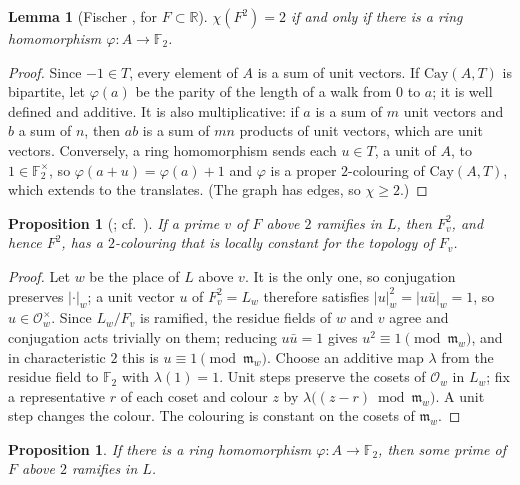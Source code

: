 \documentclass[11pt,a4paper]{amsart}
\newtheorem{proposition}[theorem]{Proposition}
\newtheorem{lemma}[theorem]{Lemma}
\theoremstyle{definition}
\newcommand{\F}{\mathbb{F}}
\newcommand{\R}{\mathbb{R}}
\newcommand{\Oo}{\mathcal{O}}
\newcommand{\m}{\mathfrak{m}}
\begin{document}
\begin{lemma}[Fischer {\cite[Theorem~1(iii)]{Fischer1990}}, for $F\subset\R$]\label{lem:ring}
$\chi(F^2)=2$ if and only if there is a ring homomorphism $\varphi:A\to\F_2$.
\end{lemma}

\begin{proof}
Since $-1\in T$, every element of $A$ is a sum of unit vectors. If $\mathrm{Cay}(A,T)$ is bipartite, let
$\varphi(a)$ be the parity of the length of a walk from $0$ to $a$; it is well defined and additive. It is also
multiplicative: if $a$ is a sum of $m$ unit vectors and $b$ a sum of $n$, then $ab$ is a sum of $mn$ products of
unit vectors, which are unit vectors. Conversely, a ring homomorphism sends each $u\in T$, a unit of $A$, to
$1\in\F_2^\times$, so $\varphi(a+u)=\varphi(a)+1$ and $\varphi$ is a proper $2$-colouring of $\mathrm{Cay}(A,T)$,
which extends to the translates. (The graph has edges, so $\chi\ge2$.)
\end{proof}

\begin{proposition}[{\cite[Theorem~A$'$]{MM}}; cf.\ {\cite[Propositions~3.2, 3.8 and~3.9]{Madore}}]\label{prop:if}
If a prime $v$ of $F$ above $2$ ramifies in $L$, then $F_v^2$, and hence $F^2$, has a $2$-colouring that is
locally constant for the topology of $F_v$.
\end{proposition}

\begin{proof}
Let $w$ be the place of $L$ above $v$. It is the only one, so conjugation preserves $|\cdot|_w$; a unit vector
$u$ of $F_v^2=L_w$ therefore satisfies $|u|_w^2=|u\bar u|_w=1$, so $u\in\Oo_w^\times$. Since $L_w/F_v$ is
ramified, the residue fields of $w$ and $v$ agree and conjugation acts trivially on them; reducing $u\bar u=1$
gives $u^2\equiv1\pmod{\m_w}$, and in characteristic $2$ this is $u\equiv1\pmod{\m_w}$. Choose an additive map
$\lambda$ from the residue field to $\F_2$ with $\lambda(1)=1$. Unit steps preserve the cosets of $\Oo_w$ in $L_w$;
fix a representative $r$ of each coset and colour $z$ by $\lambda\bigl((z-r)\bmod\m_w\bigr)$. A unit step changes
the colour. The colouring is constant on the cosets of $\m_w$.
\end{proof}

\begin{proposition}\label{prop:onlyif}
If there is a ring homomorphism $\varphi:A\to\F_2$, then some prime of $F$ above $2$ ramifies in $L$.
\end{proposition}
\end{document}
